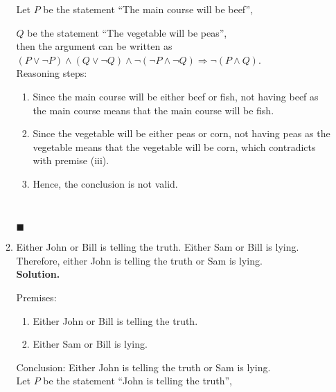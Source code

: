 \documentclass{report}
\newcommand{\sol}{\vspace{1em}\\\textbf{Solution.}\vspace{0.5em}}
\newcommand{\qed}{\ \\\strut\hfill$\blacksquare$\vspace{1em}}
\begin{document}
\begin{enumerate}[leftmargin=*]
\begin{enumerate}
                        Let $P$ be the statement ``The main course will be beef'',

                        $Q$ be the statement ``The vegetable will be peas'',\\

                        then the argument can be written as $(P \vee \neg P) \wedge (Q \vee \neg Q)
                              \wedge \neg(\neg P \wedge \neg Q) \Rightarrow \neg(P \wedge Q)$.\\

                        Reasoning steps:
                        \begin{enumerate}
                              \item Since the main course will be either beef or fish, not having beef as the main
                                    course means that the main course will be fish.

                              \item Since the vegetable will be either peas or corn, not having peas as the
                                    vegetable means that the vegetable will be corn, which contradicts with premise
                                    (iii).

                              \item Hence, the conclusion is not valid.
                        \end{enumerate} \qed

                  \item Either John or Bill is telling the truth. Either Sam or Bill is lying.
                        Therefore, either John is telling the truth or Sam is lying. \sol{}

                        Premises:
                        \begin{enumerate}
                              \item Either John or Bill is telling the truth.
                              \item Either Sam or Bill is lying.
                        \end{enumerate}
                        \vspace{1em}
                        Conclusion: Either John is telling the truth or Sam is lying.\\

                        Let $P$ be the statement ``John is telling the truth'',


\end{enumerate}
\end{enumerate}
\end{document}
